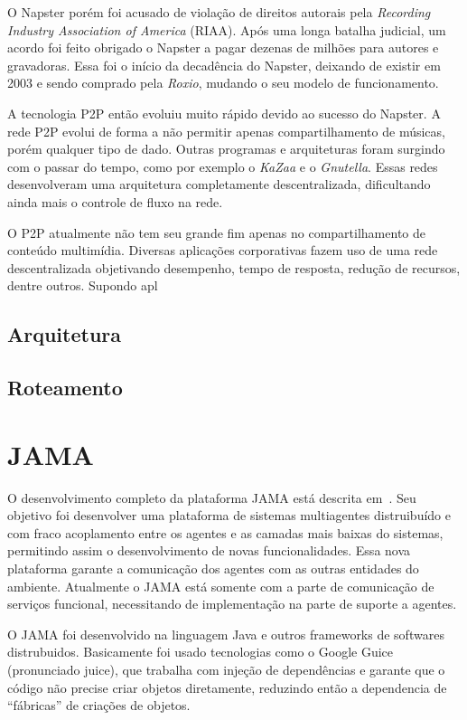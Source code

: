 O Napster porém foi acusado de violação de direitos autorais pela \emph{Recording Industry Association of America} (RIAA). Após uma longa batalha judicial, um acordo foi feito obrigado o Napster a pagar dezenas de milhões para autores e gravadoras. Essa foi o início da decadência do Napster, deixando de existir em 2003 e sendo comprado pela \emph{Roxio}, mudando o seu modelo de funcionamento.

A tecnologia P2P então evoluiu muito rápido devido ao sucesso do Napster. A rede P2P evolui de forma a não permitir apenas compartilhamento de músicas, porém qualquer tipo de dado. Outras programas e arquiteturas foram surgindo com o passar do tempo, como por exemplo o \emph{{K}a{Z}aa} e o \emph{Gnutella}. Essas redes desenvolveram uma arquitetura completamente descentralizada, dificultando ainda mais o controle de fluxo na rede.

O P2P atualmente não tem seu grande fim apenas no compartilhamento de conteúdo multimídia. Diversas aplicações corporativas fazem uso de uma rede descentralizada objetivando desempenho, tempo de resposta, redução de recursos, dentre outros. Supondo apl

\subsection{Arquitetura}

\subsection{Roteamento}

\section{JAMA}

O desenvolvimento completo da plataforma JAMA está descrita em~\cite{parise11}. Seu objetivo foi desenvolver uma plataforma de sistemas multiagentes distruibuído e com fraco acoplamento entre os agentes e as camadas mais baixas do sistemas, permitindo assim o desenvolvimento de novas funcionalidades. Essa nova plataforma garante a comunicação dos agentes com as outras entidades do ambiente. Atualmente o JAMA está somente com a parte de comunicação de serviços funcional, necessitando de implementação na parte de suporte a agentes.

O JAMA foi desenvolvido na linguagem Java e outros frameworks de softwares distrubuidos. Basicamente foi usado tecnologias como o Google Guice (pronunciado juice), que trabalha com injeção de dependências e garante que o código não precise criar objetos diretamente, reduzindo então a dependencia de ``fábricas'' de criações de objetos.

